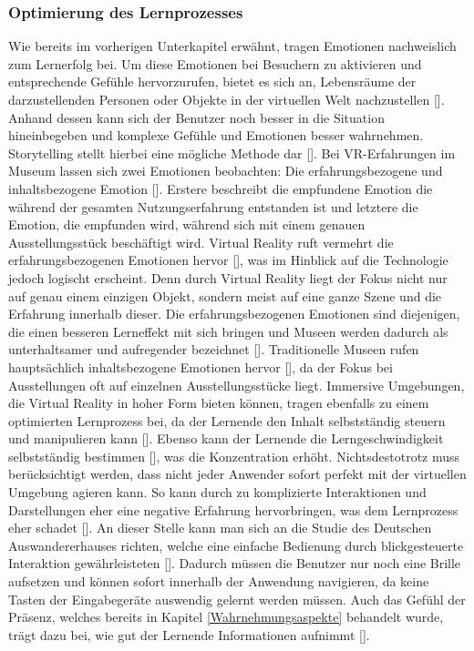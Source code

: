 \documentclass[a4paper,12pt,oneside]{article}
\begin{document}
      \subsubsection{Optimierung des Lernprozesses} \label{Optimierung des Lernprozesses}
        Wie bereits im vorherigen Unterkapitel erwähnt, tragen Emotionen nachweislich zum
        Lernerfolg bei. Um diese Emotionen bei Besuchern zu aktivieren und entsprechende
        Gefühle hervorzurufen, bietet es sich an, Lebensräume der darzustellenden Personen
        oder Objekte in der virtuellen Welt nachzustellen [\cite[35-36]{Heidsiek2019}].
        Anhand dessen kann sich der Benutzer noch besser in die Situation hineinbegeben
        und komplexe Gefühle und Emotionen besser wahrnehmen. Storytelling stellt hierbei
        eine mögliche Methode dar [\cite[35-39]{Heidsiek2019}].
        Bei VR-Erfahrungen im Museum lassen sich zwei Emotionen beobachten: 
        Die erfahrungsbezogene und inhaltsbezogene Emotion [\cite[69]{Heidsiek2019}]. 
        Erstere beschreibt die
        empfundene Emotion die während der gesamten Nutzungserfahrung entstanden ist und
        letztere die Emotion, die empfunden wird, während sich mit einem genauen
        Ausstellungsstück beschäftigt wird. Virtual Reality ruft vermehrt die 
        erfahrungsbezogenen Emotionen hervor [\cite[69]{Heidsiek2019}], was im Hinblick auf
        die Technologie jedoch logischt erscheint. Denn durch Virtual Reality liegt der
        Fokus nicht nur auf genau einem einzigen Objekt, sondern meist auf eine ganze
        Szene und die Erfahrung innerhalb dieser. Die erfahrungsbezogenen Emotionen 
        sind diejenigen, die einen besseren
        Lerneffekt mit sich bringen und Museen werden dadurch als unterhaltsamer und
        aufregender bezeichnet [\cite[69]{Heidsiek2019}]. Traditionelle Museen rufen 
        hauptsächlich inhaltsbezogene Emotionen hervor [\cite[69]{Heidsiek2019}], da der
        Fokus bei Ausstellungen oft auf einzelnen Ausstellungsstücke liegt.
        Immersive Umgebungen, die Virtual Reality in hoher Form bieten können, tragen ebenfalls
        zu einem optimierten Lernprozess bei, da der Lernende den Inhalt selbstständig steuern
        und manipulieren kann [\cite[777]{Katz2015}]. Ebenso kann der Lernende
        die Lerngeschwindigkeit selbstständig bestimmen [\cite[777]{Katz2015}],
        was die Konzentration erhöht. Nichtsdestotrotz muss berücksichtigt werden,
        dass nicht jeder Anwender sofort perfekt mit der virtuellen Umgebung agieren
        kann. So kann durch zu komplizierte Interaktionen und Darstellungen
        eher eine negative Erfahrung hervorbringen, was dem Lernprozess eher
        schadet [\cite[777]{Katz2015}]. An dieser Stelle kann man sich an die
        Studie des Deutschen Auswandererhauses richten, welche eine einfache
        Bedienung durch blickgesteuerte Interaktion gewährleisteten [\cite[38]{Heidsiek2019}].
        Dadurch müssen die Benutzer nur noch eine Brille aufsetzen und können
        sofort innerhalb der Anwendung navigieren, da keine Tasten der Eingabegeräte
        auswendig gelernt werden müssen.
        Auch das Gefühl der Präsenz, welches bereits in Kapitel \ref{Wahrnehmungsaspekte}
        behandelt wurde, trägt dazu bei, wie gut der Lernende Informationen aufnimmt
        [\cite[777]{Katz2015}].
\end{document}
